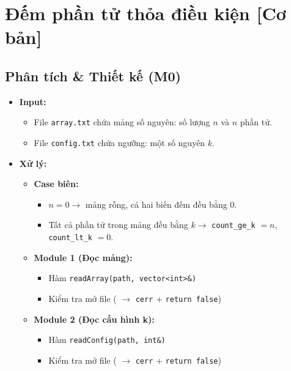 \section{Đếm phần tử thỏa điều kiện [Cơ bản]}
\subsection{Phân tích \& Thiết kế (M0)}
    \begin{itemize}
    \item \textbf{Input:}
        \begin{itemize}
            \item File \texttt{array.txt} chứa mảng số nguyên: số lượng $n$ và $n$ phần tử.
            \item File \texttt{config.txt} chứa ngưỡng: một số nguyên $k$.
        \end{itemize}

    \item \textbf{Xử lý:}
        \begin{itemize}
            \item \textbf{Case biên:}
            \begin{itemize}
                \item $n = 0 \rightarrow$ mảng rỗng, cả hai biến đếm đều bằng $0$.
                \item Tất cả phần tử trong mảng đều bằng $k \rightarrow$ \texttt{count\_ge\_k} $= n$, \texttt{count\_lt\_k} $= 0$.
            \end{itemize}
            
            \item \textbf{Module 1 (Đọc mảng):}
            \begin{itemize}
                \item Hàm \texttt{readArray(path, vector<int>\&)}
                \item Kiểm tra mở file ( $\rightarrow$ \texttt{cerr} + \texttt{return false})
            \end{itemize}

            \item \textbf{Module 2 (Đọc cấu hình k):}
            \begin{itemize}
                \item Hàm \texttt{readConfig(path, int\&)}
                \item Kiểm tra mở file ( $\rightarrow$ \texttt{cerr} + \texttt{return false})
            \end{itemize}
            

\end{itemize}
\end{itemize}
